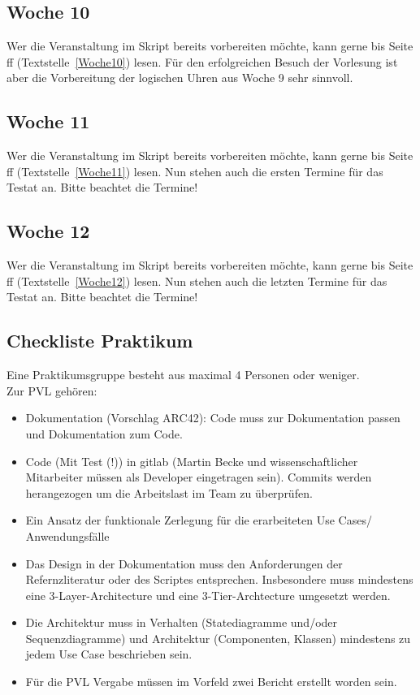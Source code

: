 \subsection{Woche 10}
Wer die Veranstaltung im Skript bereits vorbereiten möchte, kann gerne bis Seite \pageref{Woche10}ff (Textstelle~\ref{Woche10}) lesen. Für den erfolgreichen Besuch der Vorlesung ist aber die Vorbereitung der logischen Uhren aus Woche 9 sehr sinnvoll. 

\subsection{Woche 11}
Wer die Veranstaltung im Skript bereits vorbereiten möchte, kann gerne bis Seite \pageref{Woche11}ff (Textstelle~\ref{Woche11}) lesen.
Nun stehen auch die ersten Termine für das Testat an. Bitte beachtet die Termine!

\subsection{Woche 12}
Wer die Veranstaltung  im Skript bereits vorbereiten möchte, kann gerne bis Seite \pageref{Woche12}ff (Textstelle~\ref{Woche12}) lesen.
Nun stehen auch die letzten Termine für das Testat an. Bitte beachtet die Termine!

\subsection{Checkliste Praktikum}

Eine Praktikumsgruppe besteht aus maximal 4 Personen oder weniger.\\
Zur PVL gehören:
\begin{itemize}
\item Dokumentation (Vorschlag ARC42): Code muss zur Dokumentation passen und Dokumentation zum Code. 
\item Code (Mit Test (!)) in gitlab (Martin Becke und wissenschaftlicher Mitarbeiter müssen als Developer eingetragen sein). Commits werden herangezogen um die Arbeitslast im Team zu überprüfen.
\item Ein Ansatz der funktionale Zerlegung für die erarbeiteten Use Cases/ Anwendungsfälle
\item Das Design in der Dokumentation muss den Anforderungen der Refernzliteratur oder des Scriptes entsprechen. Insbesondere muss mindestens eine 3-Layer-Architecture und eine 3-Tier-Archtecture umgesetzt werden.
\item Die Architektur muss in Verhalten (Statediagramme und/oder Sequenzdiagramme) und Architektur (Componenten, Klassen) mindestens zu jedem Use Case beschrieben sein.
\item Für die PVL Vergabe müssen im Vorfeld zwei Bericht erstellt worden sein.  
\end{itemize}

	

	

	

	



 

